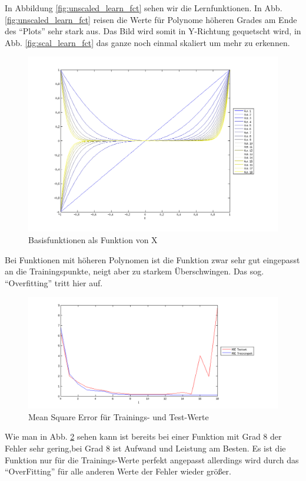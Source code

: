 In Abbildung \ref{fig:unscaled_learn_fct} sehen wir die Lernfunktionen.
In Abb. \ref{fig:unscaled_learn_fct} reisen die Werte für Polynome höheren Grades am Ende des ``Plots'' sehr stark aus.
 Das Bild wird somit in Y-Richtung gequetscht wird, in Abb. \ref{fig:scal_learn_fct} das ganze noch einmal skaliert um mehr zu erkennen.

\begin{figure}[hp!]
\begin{center}
 \includegraphics[width=1\textwidth]{./figures/1_1_1_base_fct}
 \caption[Basisfunktionen als Funktion von X]{Basisfunktionen als Funktion von X}
\label{fig:base_fct}
\end{center}
\end{figure}



Bei Funktionen mit höheren Polynomen ist die Funktion zwar sehr gut eingepasst an die Trainingspunkte, neigt aber zu starkem Überschwingen.
Das sog. ``Overfitting'' tritt hier auf.
\clearpage

\begin{figure}[hp!]
\begin{center}
 \includegraphics[width=1\textwidth]{./figures/1_1_1_MSE}
 \caption[Mean Square Error]{Mean Square Error für Trainings- und Test-Werte}
\label{fig:MSE}
\end{center}
\end{figure}

Wie man in Abb. \ref{fig:MSE} sehen kann ist bereits bei einer Funktion mit Grad 8 der Fehler sehr gering,bei Grad 8 ist  
Aufwand und Leistung am Besten. Es ist die Funktion nur für die Trainings-Werte 
perfekt angepasst allerdings wird durch das ``OverFitting'' für alle anderen Werte der Fehler wieder größer.